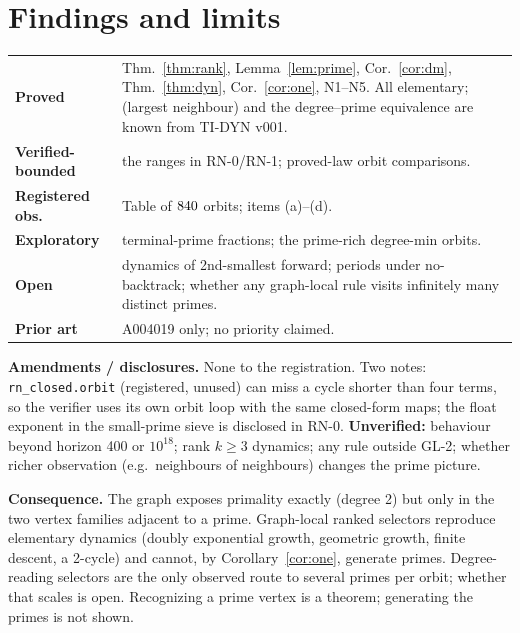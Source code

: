 \documentclass[11pt]{article}
\theoremstyle{remark}\newtheorem{remark}[theorem]{Remark}
\begin{document}
\section{Findings and limits}
\begin{center}\small\begin{tabular}{p{}p{}}\toprule
\textbf{Proved} & Thm.~\ref{thm:rank}, Lemma~\ref{lem:prime}, Cor.~\ref{cor:dm}, Thm.~\ref{thm:dyn}, Cor.~\ref{cor:one}, N1--N5. All elementary; (largest neighbour) and the degree--prime equivalence are known from TI-DYN v001.\\
\textbf{Verified-bounded} & the ranges in RN-0/RN-1; \ProvedCmp{} proved-law orbit comparisons.\\
\textbf{Registered obs.} & Table of $840$ orbits; items (a)--(d).\\
\textbf{Exploratory} & terminal-prime fractions; the prime-rich degree-min orbits.\\
\textbf{Open} & dynamics of 2nd-smallest forward; periods under no-backtrack; whether any graph-local rule visits infinitely many distinct primes.\\
\textbf{Prior art} & A004019 only; no priority claimed.\\\bottomrule\end{tabular}\end{center}
\textbf{Amendments / disclosures.} None to the registration. Two notes: \texttt{rn\_closed.orbit} (registered, unused) can miss a cycle shorter than four terms, so the verifier uses its own orbit loop with the same closed-form maps; the float exponent in the small-prime sieve is disclosed in RN-0. \textbf{Unverified:} behaviour beyond horizon 400 or $10^{18}$; rank $k\ge3$ dynamics; any rule outside GL-2; whether richer observation (e.g.\ neighbours of neighbours) changes the prime picture.

\textbf{Consequence.} The graph exposes primality exactly (degree 2) but only in the two vertex families adjacent to a prime. Graph-local ranked selectors reproduce elementary dynamics (doubly exponential growth, geometric growth, finite descent, a 2-cycle) and cannot, by Corollary~\ref{cor:one}, generate primes. Degree-reading selectors are the only observed route to several primes per orbit; whether that scales is open. Recognizing a prime vertex is a theorem; generating the primes is not shown.
\end{document}
